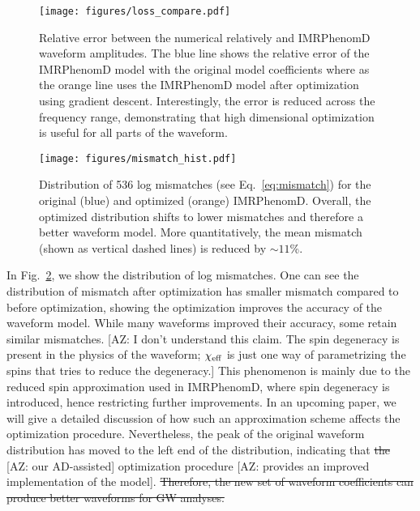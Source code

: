 \documentclass[twocolumn]{aastex631}
\newcommand{\AZ}[1]{{\color{Burnt}[AZ: #1]}}
\begin{document}
\begin{figure}[t]
	\begin{centering}
		\texttt{[image: figures/loss\_compare.pdf]}
		\caption{
			Relative error between the numerical relatively and IMRPhenomD waveform amplitudes. 
            The blue line shows the relative error of the IMRPhenomD model with the original model coefficients where as the orange line uses the IMRPhenomD model after optimization using gradient descent.
            Interestingly, the error is reduced across the frequency range, demonstrating that high dimensional optimization is useful for all parts of the waveform.
		}
		\label{fig:loss_compare}
	\end{centering}
\end{figure}

\begin{figure}[t]
	\begin{centering}
		\texttt{[image: figures/mismatch\_hist.pdf]}
		\caption{
			Distribution of 536 log mismatches (see Eq.~\ref{eq:mismatch}) for the original (blue) and optimized (orange) IMRPhenomD. 
            Overall, the optimized distribution shifts to lower mismatches and therefore a better waveform model. 
            More quantitatively, the mean mismatch (shown as vertical dashed lines) is reduced by $\sim11$\%.
		}
		\label{fig:mismatch_hist}
	\end{centering}
\end{figure}
 
In Fig.~\ref{fig:mismatch_hist}, we show the distribution of log mismatches.
One can see the distribution of mismatch after optimization has smaller mismatch compared to before optimization,
showing the optimization improves the accuracy of the waveform model.
While many waveforms improved their accuracy, some retain similar mismatches. 
\AZ{I don't understand this claim. The spin degeneracy is present in the physics of the waveform; $\chi_{\rm eff}$ is just one way of parametrizing the spins that tries to reduce the degeneracy.}
This phenomenon is mainly due to the reduced spin approximation used in IMRPhenomD, where spin degeneracy is introduced, hence restricting further improvements. 
In an upcoming paper, we will give a detailed discussion of how such an approximation scheme affects the optimization procedure. 
Nevertheless, the peak of the original waveform distribution has moved to the left end of the distribution, indicating that \sout{the} \AZ{our AD-assisted} optimization procedure \AZ{provides an improved implementation of the model}. 
\sout{Therefore, the new set of waveform coefficients can produce better waveforms for GW analyses. }
\end{document}
